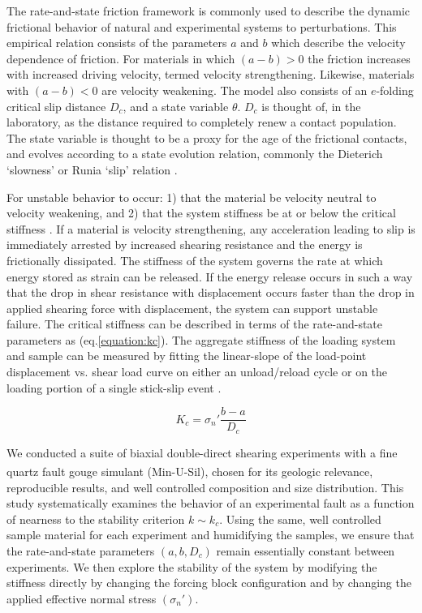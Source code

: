 \documentclass[11pt]{article}
\begin{document}
The rate-and-state friction framework is commonly used to describe the dynamic
frictional behavior of natural and experimental systems to perturbations. This
empirical relation consists of the parameters $a$ and $b$ which describe the
velocity dependence of friction. For materials in which $(a-b)>0$ the friction
increases with increased driving velocity, termed velocity strengthening. Likewise,
materials with $(a-b)<0$ are velocity weakening. The model also consists of an
$e$-folding critical slip distance $D_c$, and a state variable $\theta$.
$D_c$ is thought of, in the laboratory, as the distance required to completely
renew a contact population.
The
state variable is thought to be a proxy for the age of the frictional contacts, and
evolves according to a state evolution relation, commonly the Dieterich `slowness'
or Runia `slip' relation \cite{Marone:1998,Dieterich:1979,Ruina:1983}.

For unstable behavior to occur: 1) that the material be
velocity neutral to velocity weakening, and 2) that the system stiffness be at
or below the critical stiffness \cite{Marone:1998, Scholz:2002}. If a
material is velocity strengthening, any acceleration leading to slip is
immediately arrested by increased shearing resistance and the energy is
frictionally dissipated. The stiffness of the system governs the rate at which
energy stored as strain can be released. If the energy release occurs in such a
way that the drop in shear resistance with displacement occurs faster than the
drop in applied shearing force with displacement, the system can support
unstable failure. The critical stiffness can be described in terms of the
rate-and-state parameters as (eq.\ref{equation:kc}). The aggregate stiffness of
the loading system and sample can be measured by fitting the linear-slope
of the load-point displacement vs. shear load curve on either an unload/reload
cycle or on the loading portion of a single stick-slip event \cite{Leeman:2015}.

\begin{equation}
    K_c = \sigma_n' \frac{b-a}{D_c}
    \label{equation:kc}
\end{equation}

We conducted a suite of biaxial double-direct shearing experiments with a fine
quartz fault gouge simulant (Min-U-Sil\textsuperscript{\textregistered}), chosen
for its geologic relevance, reproducible results, and well controlled
composition and size distribution. This study systematically examines the
behavior of an experimental fault as a function of nearness to the stability
criterion $k \sim k_c$. Using the same, well  controlled sample material for
each experiment and humidifying the samples, we ensure that the rate-and-state
parameters $(a,b,D_c)$ remain essentially constant between experiments. We then explore the stability
of the system by modifying the stiffness directly by changing the forcing block
configuration and by changing the applied effective normal stress $(\sigma_n')$.
\end{document}
